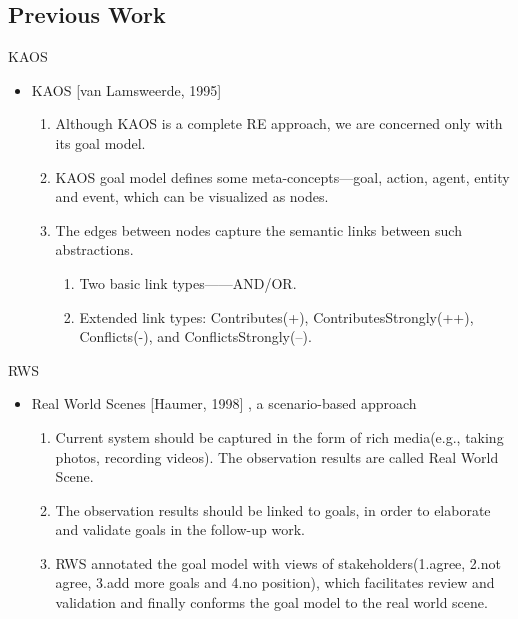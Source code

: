 \documentclass{beamer}
\begin{document}
\subsection{Previous Work}             %
\begin{frame}{KAOS}
  \begin{itemize}
  \item
    KAOS [van Lamsweerde, 1995]
    \begin{enumerate}
    \item
      Although KAOS is a complete RE approach, we are concerned only with its goal model. 
    \item
      KAOS goal model defines some meta-concepts—goal, action, agent, entity and event, which can be visualized as nodes.
    \item 
      The edges between nodes capture the semantic links between such abstractions.
      \begin{enumerate}
      \item Two basic link types——AND/OR.
      \item Extended link types: Contributes(+), ContributesStrongly(++), Conflicts(-), and ConflictsStrongly(--).
      \end{enumerate}
    \end{enumerate}
  \end{itemize}
\end{frame}
\begin{frame}{RWS}                     %
  \begin{itemize}
  \item
    Real World Scenes [Haumer, 1998] , a scenario-based approach
    \begin{enumerate}
    \item
      Current system should be captured in the form of rich media(e.g., taking photos, recording videos). The observation results are called Real World Scene. 
    \item 
      The observation results should be linked to goals, in order to elaborate and validate goals in the follow-up work.
    \item
      RWS annotated the goal model with views of stakeholders(1.agree, 2.not agree, 3.add more goals and 4.no position), which facilitates review and validation and finally conforms the goal model to the real world scene. 
    \end{enumerate}
  \end{itemize}
\end{frame}
\end{document}
